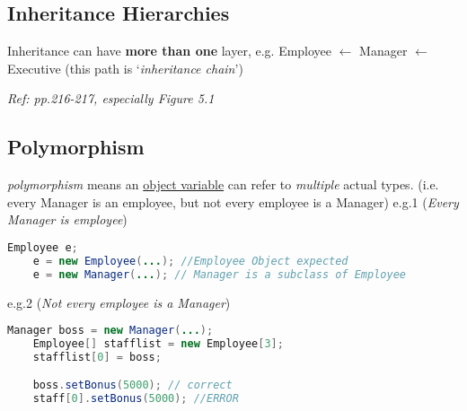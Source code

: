 \documentclass[12pt]{article}
\begin{document}
\subsection{Inheritance Hierarchies}
Inheritance can have \textbf{more than one} layer, \newline
e.g. Employee $\leftarrow$ Manager $\leftarrow$ Executive (this path is `\textit{inheritance chain}')

\textit{Ref: pp.216-217, especially Figure 5.1}

\subsection{Polymorphism} \label{polymorphism}
\emph{polymorphism} means an \underline{object variable} can refer to \textit{multiple} actual types.
(i.e. every Manager is an employee, but not every employee is a Manager)\newline
e.g.1 (\textit{Every Manager is employee})
\begin{lstlisting}[language=Java]
    Employee e;
    e = new Employee(...); //Employee Object expected
    e = new Manager(...); // Manager is a subclass of Employee
\end{lstlisting}

e.g.2 (\textit{Not every employee is a Manager})
\begin{lstlisting}[language=Java]
    Manager boss = new Manager(...);
    Employee[] stafflist = new Employee[3];
    stafflist[0] = boss;

    boss.setBonus(5000); // correct
    staff[0].setBonus(5000); //ERROR
\end{lstlisting}
\end{document}
